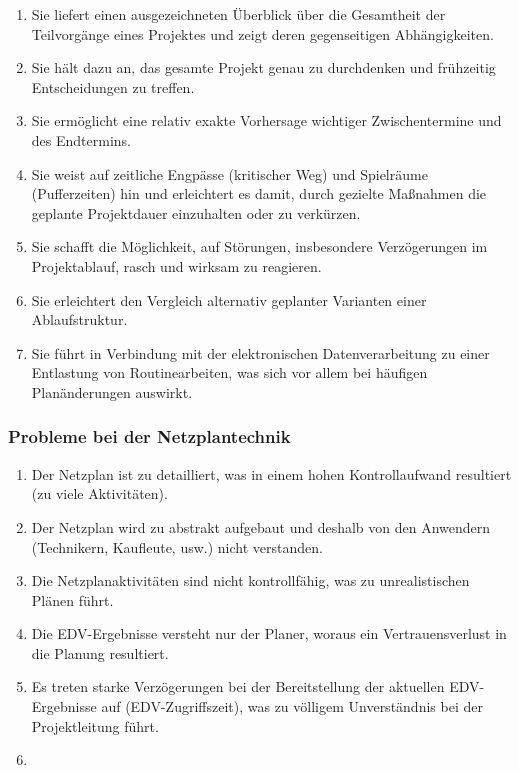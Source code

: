 \documentclass[11pt,a4paper]{article}
\begin{document}
\begin{enumerate}
	\item Sie liefert einen ausgezeichneten Überblick über die Gesamtheit der Teilvorgänge
eines Projektes und zeigt deren gegenseitigen Abhängigkeiten.
	\item Sie hält dazu an, das gesamte Projekt genau zu durchdenken und frühzeitig
Entscheidungen zu treffen.
	\item Sie ermöglicht eine relativ exakte Vorhersage wichtiger Zwischentermine und des
Endtermins.
	\item Sie weist auf zeitliche Engpässe (kritischer Weg) und Spielräume (Pufferzeiten) hin
und erleichtert es damit, durch gezielte Maßnahmen die geplante Projektdauer
einzuhalten oder zu verkürzen.
	\item Sie schafft die Möglichkeit, auf Störungen, insbesondere Verzögerungen im
Projektablauf, rasch und wirksam zu reagieren.
	\item Sie erleichtert den Vergleich alternativ geplanter Varianten einer Ablaufstruktur.
	\item Sie führt in Verbindung mit der elektronischen Datenverarbeitung zu einer Entlastung
von Routinearbeiten, was sich vor allem bei häufigen Planänderungen auswirkt.

\end{enumerate}

\subsubsection{Probleme bei der Netzplantechnik}

\begin{enumerate}
	\item Der Netzplan ist zu detailliert, was in einem hohen Kontrollaufwand resultiert (zu viele
Aktivitäten).
	\item Der Netzplan wird zu abstrakt aufgebaut und deshalb von den Anwendern (Technikern,
Kaufleute, usw.) nicht verstanden.
	\item Die Netzplanaktivitäten sind nicht kontrollfähig, was zu unrealistischen Plänen führt.
	\item Die EDV-Ergebnisse versteht nur der Planer, woraus ein Vertrauensverlust in die Planung
resultiert.
	\item Es treten starke Verzögerungen bei der Bereitstellung der aktuellen EDV-Ergebnisse auf
(EDV-Zugriffszeit), was zu völligem Unverständnis bei der Projektleitung führt.
	\item 
\end{enumerate}
\pagebreak
\end{document}
